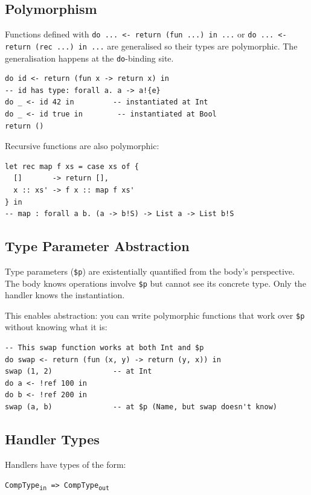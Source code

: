 \documentclass[11pt,a4paper]{article}
\newcommand{\cba}[1]{\lstinline[style=cbainline]{#1}}
\begin{document}
\subsection{Polymorphism}

Functions defined with \cba{do ... <- return (fun ...) in ...} or
\cba{do ... <- return (rec ...) in ...} are generalised so their types are
polymorphic. The generalisation happens at the \cba{do}-binding site.

\begin{lstlisting}
do id <- return (fun x -> return x) in
-- id has type: forall a. a -> a!{e}
do _ <- id 42 in         -- instantiated at Int
do _ <- id true in        -- instantiated at Bool
return ()
\end{lstlisting}

Recursive functions are also polymorphic:

\begin{lstlisting}
let rec map f xs = case xs of {
  []       -> return [],
  x :: xs' -> f x :: map f xs'
} in
-- map : forall a b. (a -> b!S) -> List a -> List b!S
\end{lstlisting}

\subsection{Type Parameter Abstraction}

Type parameters (\texttt{\$p}) are existentially quantified from the body's
perspective.  The body knows operations involve \texttt{\$p} but cannot see its
concrete type.  Only the handler knows the instantiation.

This enables abstraction: you can write polymorphic functions that work over
\texttt{\$p} without knowing what it is:

\begin{lstlisting}
-- This swap function works at both Int and $p
do swap <- return (fun (x, y) -> return (y, x)) in
swap (1, 2)              -- at Int
do a <- !ref 100 in
do b <- !ref 200 in
swap (a, b)              -- at $p (Name, but swap doesn't know)
\end{lstlisting}

\subsection{Handler Types}
\label{sec:handlertypes}

Handlers have types of the form:

\begin{center}
\texttt{CompType\textsubscript{in} => CompType\textsubscript{out}}
\end{center}
\end{document}
